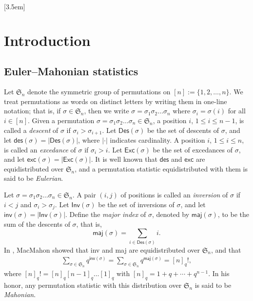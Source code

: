 \documentclass[12pt]{article}
\begin{document}
[3.5em]
{\footnotesize \vspace{-10pt}}
{\contentslabel{2.3em}}{\hspace*{-4em}}
{~~\contentspage}


\section{Introduction}
\subsection{Euler--Mahonian statistics} 
Let $\mathfrak{S}_{n}$ denote the symmetric group of permutations on $[n]:=\{1,2,\ldots,n\}$.
We treat permutations as words on distinct letters by writing them in one-line notation; 
that is, if  $\sigma\in\mathfrak{S}_{n}$,
then we write $\sigma=\sigma_{1}\sigma_{2}\ldots\sigma_{n}$ where 
$\sigma_{i}=\sigma(i)$ for all $i\in[n]$.
Given a permutation $\sigma=\sigma_{1}\sigma_{2}\ldots\sigma_{n}\in\mathfrak{S}_{n}$,
a position $i$, $1\leq i\leq n-1$, is called a \emph{descent} of $\sigma$ if $\sigma_{i}>\sigma_{i+1}$.
Let $\textsf{Des}(\sigma)$ be the set  of descents of $\sigma$,
and let $\textsf{des}(\sigma)=|\textsf{Des}(\sigma)|$,
where $|\cdot|$ indicates cardinality.
A position $i$, $1\leq i\leq n$, is called 
an \emph{excedance} of $\sigma$ if $\sigma_{i}>i$.
Let $\textsf{Exc}(\sigma)$ be the set of excedances of $\sigma$,
and let $\textsf{exc}(\sigma)=|\textsf{Exc}(\sigma)|$.
It is well known that $\textsf{des}$ and $\textsf{exc}$ are equidistributed over $\mathfrak{S}_{n}$,
and a permutation statistic equidistributed with them is said to be \emph{Eulerian}.

Let $\sigma=\sigma_{1}\sigma_{2}\ldots\sigma_{n}\in\mathfrak{S}_{n}$.
A pair $(i,j)$ of positions  is called an \emph{inversion} of $\sigma$ if $i<j$ and $\sigma_{i}>\sigma_{j}$. 
Let $\textsf{Inv}(\sigma)$ be the set of inversions of $\sigma$,
and let $\textsf{inv}(\sigma)=|\textsf{Inv}(\sigma)|$.
Define the \emph{major index} of $\sigma$, denoted by $\textsf{maj}(\sigma)$,  to be  the sum of the descents of $\sigma$, that is,
$$\textsf{maj}(\sigma)=\sum_{i\in\textsf{Des}(\sigma)}i.$$
In \cite{MacMahon-1916},  MacMahon showed that \textsf{inv} and \textsf{maj} are equidistributed over $\mathfrak{S}_{n}$, and that
\begin{align*} 
	\sum_{\sigma\in\mathfrak{S}_{n}}q^{\textsf{inv}(\sigma)}=\sum_{\sigma\in\mathfrak{S}_{n}}q^{\textsf{maj}(\sigma)}=[n]_{q}!,
\end{align*}
where  
$[n]_{q}!=[n]_{q}[n-1]_{q}\ldots[1]_{q}$
with 
$[n]_{q}=1+q+\cdots+q^{n-1}.$
In his honor, any permutation statistic with this distribution over $\mathfrak{S}_{n}$ is said to be \emph{Mahonian}.
\end{document}
